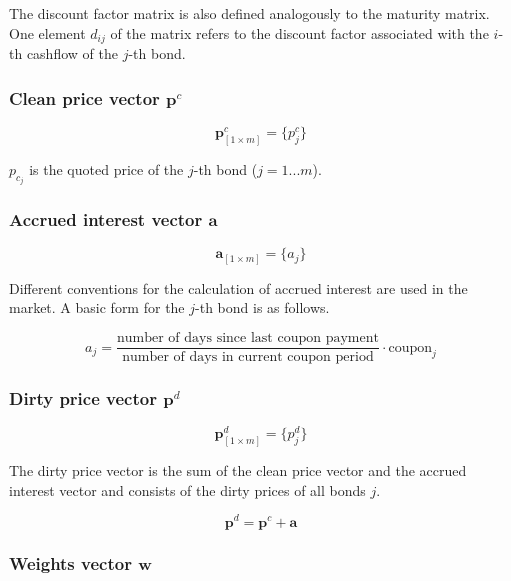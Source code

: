  The discount factor matrix is also defined analogously to the maturity matrix. One element $d_{ij}$ of the matrix refers to the discount factor associated with  the $i$-th cashflow of the $j$-th bond.

\subsubsection*{Clean price vector $\bm{p}^c$}

 \begin{equation}\label{pc}
\bm{p}^c_{\left[1\times m\right]}= \{p^c_j\}
\end{equation}

$p_{c_j}$ is the quoted price of the $j$-th bond ($j=1...m$).

\subsubsection*{Accrued interest vector $\bm{a}$}

  \begin{equation}\label{a}
\bm{a}_{\left[1\times m\right]}= \{a_j\}
\end{equation}

Different conventions for the calculation of accrued interest are used in the market. A basic form for the $j$-th bond is as follows.

\begin{equation}
    a_j= \frac{\mbox{number of days since last coupon payment}}{\mbox{number of days in current coupon period}}\cdot \mbox{coupon}_j
\end{equation}
 	

\subsubsection*{Dirty price vector $\bm{p}^d$}

\begin{equation}\label{pd}
    \bm{p}^d_{\left[1\times m\right]}= \{p^d_j\}
\end{equation}

The dirty price vector is the sum of the clean price vector and the accrued interest vector and consists of the dirty prices of all bonds $j$.

\begin{displaymath}
\bm{p}^d=\bm{p}^c+\bm{a}
\end{displaymath}

\subsubsection*{Weights vector $\bm{w}$}

